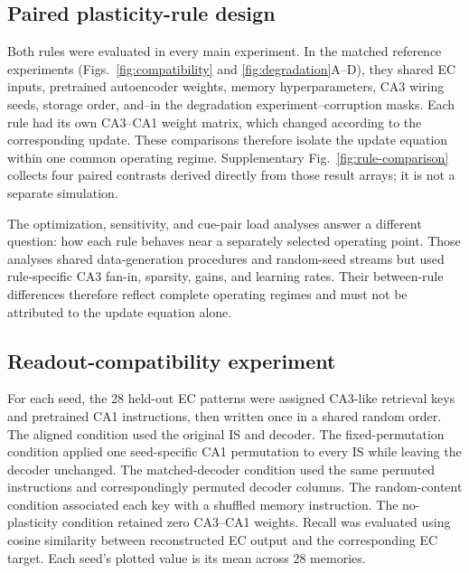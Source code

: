 \subsection{Paired plasticity-rule design}

Both rules were evaluated in every main experiment. In the matched reference
experiments (Figs.~\ref{fig:compatibility} and
\ref{fig:degradation}A--D), they shared EC inputs, pretrained autoencoder
weights, memory hyperparameters, CA3 wiring seeds, storage order, and--in the
degradation experiment--corruption masks. Each rule had its own CA3--CA1 weight
matrix, which changed according to the corresponding update. These comparisons
therefore isolate the update equation within one common operating regime.
Supplementary Fig.~\ref{fig:rule-comparison} collects four paired contrasts
derived directly from those result arrays; it is not a separate simulation.

The optimization, sensitivity, and cue-pair load analyses answer a different
question: how each rule behaves near a separately selected operating point.
Those analyses shared data-generation procedures and random-seed streams but
used rule-specific CA3 fan-in, sparsity, gains, and learning rates. Their
between-rule differences therefore reflect complete operating regimes and
must not be attributed to the update equation alone.

\subsection{Readout-compatibility experiment}

For each seed, the 28 held-out EC patterns were assigned CA3-like retrieval keys
and pretrained CA1 instructions, then written once in a shared random order.
The aligned condition used the original IS and decoder. The fixed-permutation
condition applied one seed-specific CA1 permutation to every IS while leaving
the decoder unchanged. The matched-decoder condition used the same permuted
instructions and correspondingly permuted decoder columns. The random-content
condition associated each key with a shuffled memory instruction. The
no-plasticity condition retained zero CA3--CA1 weights. Recall was evaluated
using cosine similarity between reconstructed EC output and the corresponding
EC target. Each seed's plotted value is its mean across 28 memories.

